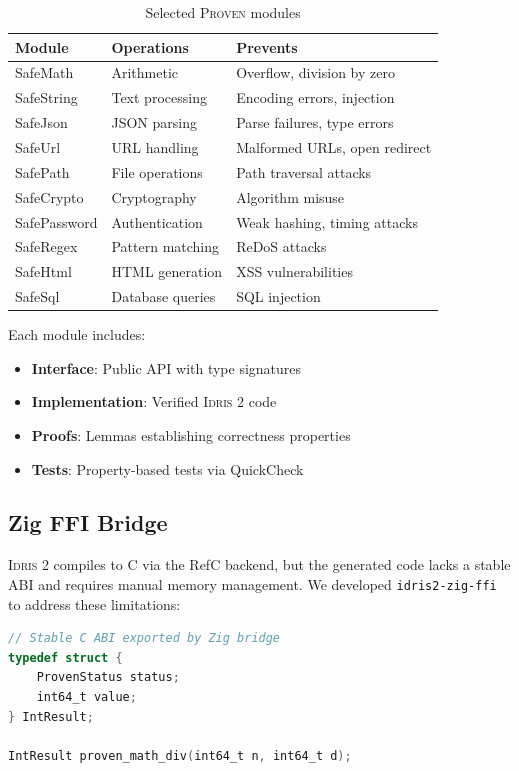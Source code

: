 \documentclass[11pt,a4paper]{article}
\newcommand{\proven}{\textsc{Proven}}
\newcommand{\idris}{\textsc{Idris 2}}
\begin{document}
\begin{table}[ht]
\centering
\begin{tabular}{lll}
\toprule
\textbf{Module} & \textbf{Operations} & \textbf{Prevents} \\
\midrule
SafeMath & Arithmetic & Overflow, division by zero \\
SafeString & Text processing & Encoding errors, injection \\
SafeJson & JSON parsing & Parse failures, type errors \\
SafeUrl & URL handling & Malformed URLs, open redirect \\
SafePath & File operations & Path traversal attacks \\
SafeCrypto & Cryptography & Algorithm misuse \\
SafePassword & Authentication & Weak hashing, timing attacks \\
SafeRegex & Pattern matching & ReDoS attacks \\
SafeHtml & HTML generation & XSS vulnerabilities \\
SafeSql & Database queries & SQL injection \\
\bottomrule
\end{tabular}
\caption{Selected \proven{} modules}
\label{tab:modules}
\end{table}

Each module includes:
\begin{itemize}
    \item \textbf{Interface}: Public API with type signatures
    \item \textbf{Implementation}: Verified \idris{} code
    \item \textbf{Proofs}: Lemmas establishing correctness properties
    \item \textbf{Tests}: Property-based tests via QuickCheck
\end{itemize}

\subsection{Zig FFI Bridge}

\idris{} compiles to C via the RefC backend, but the generated code lacks a stable ABI and requires manual memory management. We developed \texttt{idris2-zig-ffi} to address these limitations:

\begin{lstlisting}[language=C]
// Stable C ABI exported by Zig bridge
typedef struct {
    ProvenStatus status;
    int64_t value;
} IntResult;

IntResult proven_math_div(int64_t n, int64_t d);
\end{lstlisting}
\end{document}
